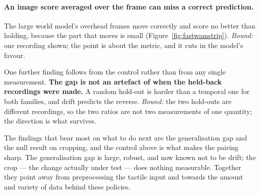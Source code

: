 \paragraph{\textbf{An image score averaged over the frame can miss a correct
prediction.}} The large world model's overhead frames move correctly and score
no better than holding, because the part that moves is small
(Figure~\ref{fig:fastwamstrip}). \emph{Bound:} one recording shown; the point
is about the metric, and it cuts in the model's favour.

One further finding follows from the control rather than from any single
measurement. \textbf{The gap is not an artefact of when the held-back
recordings were made.} A random hold-out is harder than a temporal one for both
families, and drift predicts the reverse. \emph{Bound:} the two hold-outs are
different recordings, so the two ratios are not two measurements of one
quantity; the direction is what survives.

The findings that bear most on what to do next are the generalisation gap
and the null result on cropping,
and the control above is what makes the pairing sharp. The generalisation gap
is large, robust, and now known not to be drift; the crop --- the change
actually under test --- does nothing measurable. Together they point away from
preprocessing the tactile input and towards the amount and variety of data
behind these policies.
